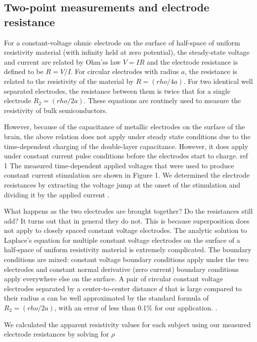 \subsection{Two-point measurements and electrode resistance}

For a constant-voltage ohmic electrode on the surface of half-space of uniform resistivity material (with infinity held at zero potential), the steady-state voltage and current are related by Ohm’ss law $V=IR$ and the electrode resistance is defined to be $R=V/I$. For circular electrodes with radius $a$, the resistance is related to the resistivity of the material by $R=(rho/4a)$. For two identical well separated electrodes, the resistance between them is twice that for a single electrode $R_2=(rho/2a)$. These equations are routinely used to measure the resistivity of bulk semiconductors.

However, because of the capacitance of metallic electrodes on the surface of the brain, the above relation does not apply under steady state conditions due to the time-dependent charging of the double-layer capacitance. However, it does apply under constant current pulse conditions before the electrodes start to charge. {ref 1} The measured time-dependent applied voltages that were used to produce constant current stimulation are shown in Figure 1. We determined the electrode resistances by extracting the voltage jump at the onset of the stimulation and dividing it by the applied current \cite{Huang2008a}.

What happens as the two electrodes are brought together? Do the resistances still add? It turns out that in general they do not. This is because superposition does not apply to closely spaced constant voltage electrodes. The analytic solution to Laplace’s equation for multiple constant voltage electrodes on the surface of a half-space of uniform resistivity material is extremely complicated. The boundary conditions are mixed: constant voltage boundary conditions apply under the two electrodes and constant normal derivative (zero current) boundary conditions apply everywhere else on the surface. A pair of circular constant voltage electrodes separated by a center-to-center distance $d$ that is large compared to their radius $a$ can be well approximated by the standard formula of $R_2=(rho/2a)$, with an error of less than 0.1\% for our application. \cite{Kristiansson2005}.

We calculated the apparent resistivity values for each subject using our measured electrode resistances by solving for $\rho$

